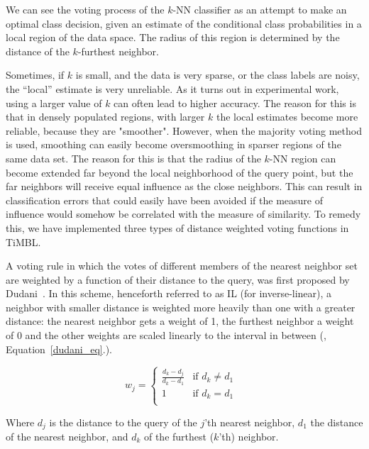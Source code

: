 \documentclass{book}
\begin{document}
We can see the voting process of the $k$-NN classifier as an attempt
to make an optimal class decision, given an estimate of the
conditional class probabilities in a local region of the data space.
The radius of this region is determined by the distance of the
$k$-furthest neighbor.

Sometimes, if $k$ is small, and the data is very sparse, or the class
labels are noisy, the ``local'' estimate is very unreliable.  As it
turns out in experimental work, using a larger value of $k$ can often
lead to higher accuracy. The reason for this is that in densely
populated regions, with larger $k$ the local estimates become more
reliable, because they are "smoother".  However, when the majority
voting method is used, smoothing can easily become oversmoothing in
sparser regions of the same data set. The reason for this is that the
radius of the $k$-NN region can become extended far beyond the local
neighborhood of the query point, but the far neighbors will receive
equal influence as the close neighbors. This can result in
classification errors that could easily have been avoided if the
measure of influence would somehow be correlated with the measure of
similarity. To remedy this, we have implemented three types of distance
weighted voting functions in TiMBL.

A voting rule in which the votes of different members of the nearest
neighbor set are weighted by a function of their distance to the
query, was first proposed by Dudani~. In this
scheme, henceforth referred to as IL (for inverse-linear), a neighbor
with smaller distance is weighted more heavily than one with a greater
distance: the nearest neighbor gets a weight of 1, the furthest
neighbor a weight of 0 and the other weights are scaled linearly to
the interval in between (, Equation~\ref{dudani_eq}.).

\begin{equation}
\label{dudani_eq}
w_{j}= \left \{ \begin{array}{ll}
                        \frac{d_{k} - d_{j}}{d_{k} - d_{1}} & \mbox{if $d_{k}
\not= d_{1}$ } \\
                        1 & \mbox{if $d_{k} = d_{1}$}\\
                    \end{array}
          \right.
\end{equation}

Where $d_{j}$ is the distance to the query of the $j$'th nearest
neighbor, $d_{1}$ the distance of the nearest neighbor, and $d_{k}$ of
the furthest ($k$'th) neighbor.
\end{document}
